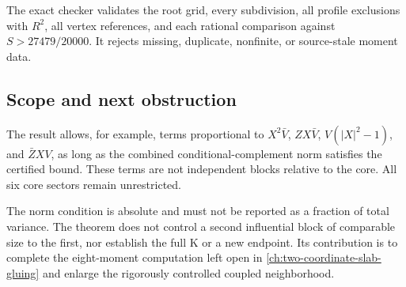 The exact checker validates the root grid, every subdivision,
all profile exclusions with \(R^2\), all vertex references, and
each rational comparison against \(S>27479/20000\).
It rejects missing, duplicate, nonfinite, or source-stale moment data.

\subsection{Scope and next obstruction}
The result allows, for example, terms proportional to
\(X^2\bar V\), \(ZX\bar V\), \(V(|X|^2-1)\), and
\(\bar ZXV\), as long as the combined conditional-complement norm
satisfies the certified bound.
These terms are not independent blocks relative to the core.
All six core sectors remain unrestricted.

The norm condition is absolute and must not be reported as a
fraction of total variance.
The theorem does not control a second influential block of comparable
size to the first, nor establish the full K or a new endpoint.
Its contribution is to complete the eight-moment computation left open
in \autoref{ch:two-coordinate-slab-gluing} and enlarge the rigorously controlled coupled neighborhood.
